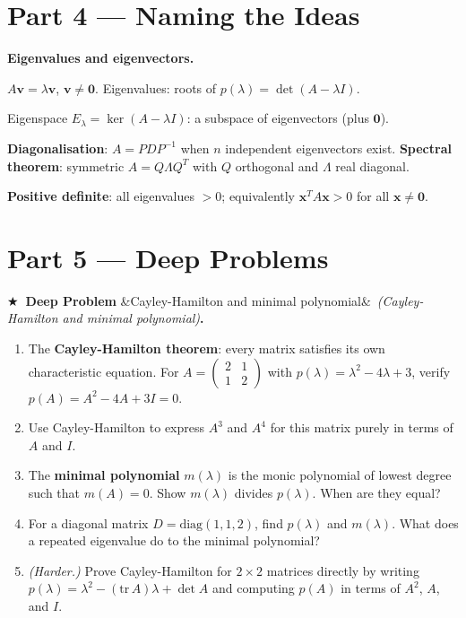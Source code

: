\documentclass[12pt, a4paper]{article}
\newcounter{problem}
\newcounter{deepproblem}
\newenvironment{deepproblem}[1][]{\refstepcounter{deepproblem}\par\vspace{6pt}\noindent\textbf{\color{NavyBlue}$\bigstar$\ Deep Problem \thedeepproblem}\ifx&#1&\else\ \textit{(#1)}\fi\textbf{.}\enskip}{\par\vspace{4pt}}
\begin{document}
\section{Part 4 \texorpdfstring{---}{--} Naming the Ideas}

\begin{namebox}
\textbf{Eigenvalues and eigenvectors.}

$A\mathbf{v} = \lambda\mathbf{v}$, $\mathbf{v} \neq \mathbf{0}$. Eigenvalues: roots of $p(\lambda) = \det(A-\lambda I)$.

Eigenspace $E_\lambda = \ker(A - \lambda I)$: a subspace of eigenvectors (plus $\mathbf{0}$).

\textbf{Diagonalisation}: $A = PDP^{-1}$ when $n$ independent eigenvectors exist. \textbf{Spectral theorem}: symmetric $A = Q\Lambda Q^T$ with $Q$ orthogonal and $\Lambda$ real diagonal.

\textbf{Positive definite}: all eigenvalues $>0$; equivalently $\mathbf{x}^T A \mathbf{x} > 0$ for all $\mathbf{x}\neq\mathbf{0}$.
\end{namebox}

\section{Part 5 \texorpdfstring{---}{--} Deep Problems}

\begin{deepproblem}[Cayley-Hamilton and minimal polynomial]
\begin{enumerate}[label=(\alph*)]
  \item The \textbf{Cayley-Hamilton theorem}: every matrix satisfies its own characteristic equation. For $A = \begin{pmatrix}2&1\\1&2\end{pmatrix}$ with $p(\lambda) = \lambda^2 - 4\lambda + 3$, verify $p(A) = A^2 - 4A + 3I = 0$.
  \item Use Cayley-Hamilton to express $A^3$ and $A^4$ for this matrix purely in terms of $A$ and $I$.
  \item The \textbf{minimal polynomial} $m(\lambda)$ is the monic polynomial of lowest degree such that $m(A) = 0$. Show $m(\lambda)$ divides $p(\lambda)$. When are they equal?
  \item For a diagonal matrix $D = \text{diag}(1,1,2)$, find $p(\lambda)$ and $m(\lambda)$. What does a repeated eigenvalue do to the minimal polynomial?
  \item \textit{(Harder.)} Prove Cayley-Hamilton for $2\times 2$ matrices directly by writing $p(\lambda) = \lambda^2 - (\text{tr}\,A)\lambda + \det A$ and computing $p(A)$ in terms of $A^2$, $A$, and $I$.
\end{enumerate}
\end{deepproblem}
\end{document}
